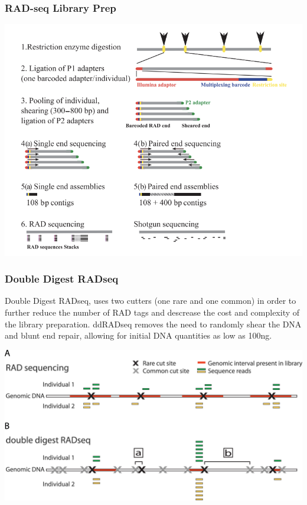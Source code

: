 \documentclass[pdf]{beamer}
\begin{document}
\begin{frame}
  \frametitle{RAD-seq Library Prep}
\begin{center}
\includegraphics[scale=0.35]{Figures/RADseq.png} 
\end{center}
\end{frame}

\begin{frame}
\frametitle{Double Digest RADseq}
Double Digest RADseq, uses two cutters (one rare and one common) in order to further reduce the number of RAD tags and descrease the cost and complexity of the library preparation. ddRADseq removes the need to randomly shear the DNA and blunt end repair, allowing for initial DNA quantities as low as 100ng. 
\begin{center}
\includegraphics[scale=0.70]{Figures/ddRadseq.png} 
\end{center}
\end{frame}
\end{document}
